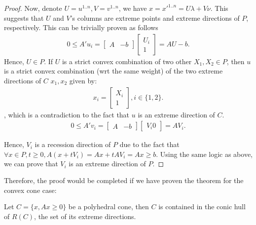 \begin{proof}
Now, denote \( U = u^{1..n}, V = v^{1..n} \), we have \( x = x'^{1..n} =
U\lambda+V\nu \). This suggests that \( U \) and \( V \)'s columns are
extreme points and extreme directions of \( P\), respectively. This can be
trivially proven as follows
\begin{align*}
  0 \le  A'u_{i} = \begin{bmatrix} A & -b \end{bmatrix}  \begin{bmatrix} U_{i}
\\ 1 \end{bmatrix}  = AU - b
.\end{align*}
Hence, \( U \in P \). If \( U \) is a strict convex combination of two other \(
X_{1}, X_{2} \in P\), then \( u \) is a strict convex combination (wrt the same
weight) of the two extreme directions of \( C \) \( x_{1}, x_{2} \) given by:
\begin{align*}
  x_{i} = \begin{bmatrix} X_{i} \\ 1 \end{bmatrix}, i \in \{1, 2\}  
.\end{align*}, which is a contradiction to the fact that \( u \) is an extreme
direction of \( C \).
\begin{align*}
  0 \le  A'v_{i} = \begin{bmatrix} A & -b \end{bmatrix} \begin{bmatrix} V_{i} 0
\end{bmatrix}  = AV_{i}
.\end{align*}

Hence, \( V_{i} \) is a recession direction of \( P \) due to the fact that \(
\forall x \in P, t \ge  0, A(x+tV_{i}) = Ax + tAV_{i} = Ax \ge  b \). Using the
same logic as above, we can prove that \( V_{i} \) is an extreme direction of \(
P\).

\end{proof}

Therefore, the proof would be completed if we have proven the theorem for the
convex cone case:

\begin{theorem}
  Let \( C = \{x, Ax \ge  0\}   \) be a polyhedral cone, then \( C \) is
  contained in the conic hull of \( R(C) \), the set of its extreme directions.
\end{theorem}

